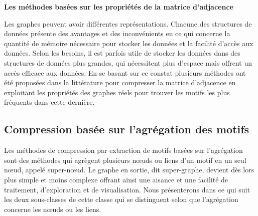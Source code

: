 \documentclass[a4paper,oneside,12pt]{report}
\theoremstyle{definition}
\begin{document}
							
							
							
							
							
			\newpage
					 \textbf{Les méthodes basées sur les propriétés de la matrice d'adjacence}
							
							Les graphes peuvent avoir différentes représentations. Chacune des structures de données présente des avantages et des inconvénients en ce qui concerne la quantité de mémoire nécessaire pour stocker les données et la facilité d'accès aux données. Selon les besoins, il est parfois utile de stocker les données dans des structures de données plus grandes, qui nécessitent plus d'espace mais offrent un accès efficace aux données. En se basant sur ce constat plusieurs méthodes ont été  proposées dans la littérature pour compresser la matrice d'adjacence en exploitant les propriétés des graphes réels pour trouver les motifs les plus fréquents dans cette dernière.
							
							
							
					
				
				\subsection{Compression basée sur l'agrégation des motifs}
				
					Les méthodes de compression par extraction de motifs basées sur l'agrégation sont des méthodes   qui agrègent plusieurs nœuds ou liens d'un motif en un seul nœud, appelé super-nœud. Le graphe en sortie, dit super-graphe, devient dès lors plus simple et moins complexe offrant ainsi une aisance et une facilité de traitement, d'exploration et de visualisation. Nous présenterons dans ce qui suit les deux sous-classes de cette classe qui se distinguent selon que l'agrégation concerne les nœuds ou les liens.
					
\end{document}

